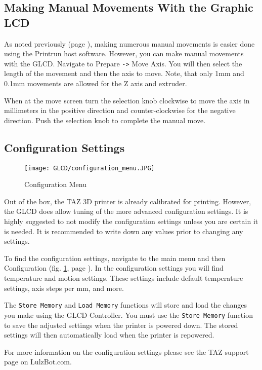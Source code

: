 \subsection{Making Manual Movements With the Graphic LCD}
As noted previously (page \pageref{sec:Graphic LCD or Printrun Host?}), making numerous manual movements is easier done using the Printrun host software. However, you can make manual movements with the GLCD. Navigate to Prepare \texttt{->} Move Axis. You will then select the length of the movement and then the axis to move. Note, that only 1mm and 0.1mm movements are allowed for the Z axis and extruder.

When at the move screen turn the selection knob clockwise to move the axis in millimeters in the positive direction and counter-clockwise for the negative direction. Push the selection knob to complete the manual move.

\subsection{Configuration Settings}

\begin{figure}[H]
\centering
\texttt{[image: GLCD/configuration\_menu.JPG]}
\caption{Configuration Menu}
\label{fig:configuration_menu}
\end{figure}

Out of the box, the TAZ 3D printer is already calibrated for printing. However, the GLCD does allow tuning of the more advanced configuration settings. It is highly suggested to not modify the configuration settings unless you are certain it is needed. It is recommended to write down any values prior to changing any settings.

To find the configuration settings, navigate to the main menu and then Configuration (fig. \ref{fig:configuration_menu}, page \pageref{fig:configuration_menu}). In the configuration settings you will find temperature and motion settings. These settings include default temperature settings, axis steps per mm, and more.

The \texttt{Store Memory} and \texttt{Load Memory} functions will store and load the changes you make using the GLCD Controller. You must use the \texttt{Store Memory} function to save the adjusted settings when the printer is powered down. The stored settings will then automatically load when the printer is repowered.

For more information on the configuration settings please see the TAZ support page on LulzBot.com.




